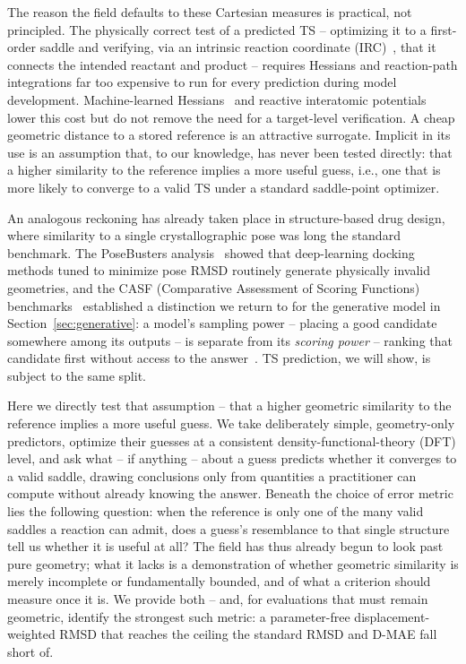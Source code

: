 \documentclass[11pt]{article}
\begin{document}
The reason the field defaults to these Cartesian measures is practical, not
principled. The physically correct test of a predicted TS -- optimizing it to a
first-order saddle and verifying, via an intrinsic reaction coordinate
(IRC)~\cite{Fukui1981}, that it connects the intended reactant and product --
requires Hessians and reaction-path integrations far too expensive to run for
every prediction during model development. Machine-learned
Hessians~\cite{Yuan2024} and reactive interatomic potentials~\cite{Busk2023}
lower this cost but do not remove the need for a target-level verification. A
cheap geometric distance to a stored reference is an attractive surrogate. Implicit in its use is
an assumption that, to our knowledge, has never been tested directly: that a higher
similarity to the reference implies a more useful guess, i.e., one that is
more likely to converge to a valid TS under a standard saddle-point optimizer.

An analogous reckoning has already taken place in structure-based drug design,
where similarity to a single crystallographic pose was long the standard
benchmark. The PoseBusters analysis~\cite{PoseBusters} showed that deep-learning docking
methods tuned to minimize pose RMSD routinely generate physically invalid
geometries, and the CASF (Comparative Assessment of Scoring Functions)
benchmarks~\cite{CASF2016} established a distinction we return to for the generative
model in Section~\ref{sec:generative}: a model's sampling power -- placing a
good candidate somewhere among its outputs -- is separate from its \emph{scoring
power} -- ranking that candidate first without access to the answer~\cite{Wang2016}. TS prediction, we will show, is
subject to the same split.

Here we directly test that assumption -- that a higher geometric similarity to the
reference implies a more useful guess. We take deliberately simple, geometry-only
predictors, optimize their guesses at a consistent density-functional-theory (DFT)
level, and ask what -- if anything -- about a guess predicts whether it converges to
a valid saddle, drawing conclusions only from quantities a practitioner can compute
without already knowing the answer. Beneath the choice of error metric lies the
following question: when the reference is only one of the many valid saddles a
reaction can admit, does a guess's resemblance to that single structure tell us
whether it is useful at all?
The field has thus already begun to look past pure geometry; what it lacks is a
demonstration of whether geometric similarity is merely incomplete or
fundamentally bounded, and of what a criterion should measure once it is.
We provide both -- and, for evaluations that must remain geometric, identify the
strongest such metric: a parameter-free displacement-weighted RMSD that reaches
the ceiling the standard RMSD and D-MAE fall short of.
\end{document}
